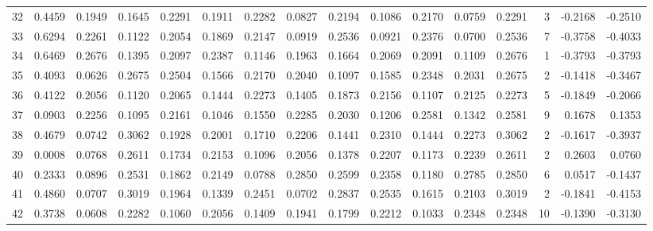 \begin{tabular}{lrrrrrrrrrrrrrrr}
32  &      0.4459 &  0.1949 &  0.1645 &  0.2291 &  0.1911 &  0.2282 &  0.0827 &  0.2194 &  0.1086 &  0.2170 &   0.0759 &     0.2291 &      3 &                   -0.2168 &                    -0.2510 \\
33  &      0.6294 &  0.2261 &  0.1122 &  0.2054 &  0.1869 &  0.2147 &  0.0919 &  0.2536 &  0.0921 &  0.2376 &   0.0700 &     0.2536 &      7 &                   -0.3758 &                    -0.4033 \\
34  &      0.6469 &  0.2676 &  0.1395 &  0.2097 &  0.2387 &  0.1146 &  0.1963 &  0.1664 &  0.2069 &  0.2091 &   0.1109 &     0.2676 &      1 &                   -0.3793 &                    -0.3793 \\
35  &      0.4093 &  0.0626 &  0.2675 &  0.2504 &  0.1566 &  0.2170 &  0.2040 &  0.1097 &  0.1585 &  0.2348 &   0.2031 &     0.2675 &      2 &                   -0.1418 &                    -0.3467 \\
36  &      0.4122 &  0.2056 &  0.1120 &  0.2065 &  0.1444 &  0.2273 &  0.1405 &  0.1873 &  0.2156 &  0.1107 &   0.2125 &     0.2273 &      5 &                   -0.1849 &                    -0.2066 \\
37  &      0.0903 &  0.2256 &  0.1095 &  0.2161 &  0.1046 &  0.1550 &  0.2285 &  0.2030 &  0.1206 &  0.2581 &   0.1342 &     0.2581 &      9 &                    0.1678 &                     0.1353 \\
38  &      0.4679 &  0.0742 &  0.3062 &  0.1928 &  0.2001 &  0.1710 &  0.2206 &  0.1441 &  0.2310 &  0.1444 &   0.2273 &     0.3062 &      2 &                   -0.1617 &                    -0.3937 \\
39  &      0.0008 &  0.0768 &  0.2611 &  0.1734 &  0.2153 &  0.1096 &  0.2056 &  0.1378 &  0.2207 &  0.1173 &   0.2239 &     0.2611 &      2 &                    0.2603 &                     0.0760 \\
40  &      0.2333 &  0.0896 &  0.2531 &  0.1862 &  0.2149 &  0.0788 &  0.2850 &  0.2599 &  0.2358 &  0.1180 &   0.2785 &     0.2850 &      6 &                    0.0517 &                    -0.1437 \\
41  &      0.4860 &  0.0707 &  0.3019 &  0.1964 &  0.1339 &  0.2451 &  0.0702 &  0.2837 &  0.2535 &  0.1615 &   0.2103 &     0.3019 &      2 &                   -0.1841 &                    -0.4153 \\
42  &      0.3738 &  0.0608 &  0.2282 &  0.1060 &  0.2056 &  0.1409 &  0.1941 &  0.1799 &  0.2212 &  0.1033 &   0.2348 &     0.2348 &     10 &                   -0.1390 &                    -0.3130 \\

\end{tabular}

